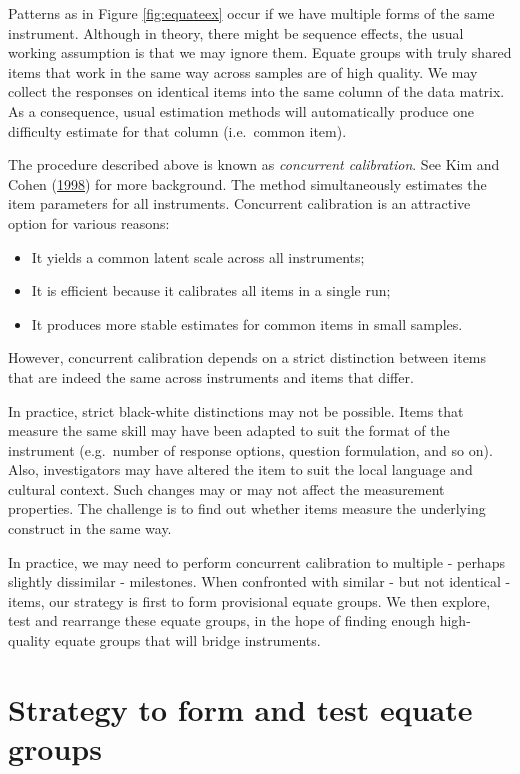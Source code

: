 \documentclass[
]{book}
\providecommand{\tightlist}{%
  \setlength{\itemsep}{0pt}\setlength{\parskip}{0pt}}
\begin{document}
Patterns as in Figure \ref{fig:equateex} occur if we have multiple forms of the same instrument. Although in theory, there might be sequence effects, the usual working assumption is that we may ignore them. Equate groups with truly shared items that work in the same way across samples are of high quality. We may collect the responses on identical items into the same column of the data matrix. As a consequence, usual estimation methods will automatically produce one difficulty estimate for that column (i.e.~common item).

The procedure described above is known as \emph{concurrent calibration}. See Kim and Cohen (\protect\hyperlink{ref-kim1998}{1998}) for more background. The method simultaneously estimates the item parameters for all instruments. Concurrent calibration is an attractive option for various reasons:

\begin{itemize}
\tightlist
\item
  It yields a common latent scale across all instruments;
\item
  It is efficient because it calibrates all items in a single run;
\item
  It produces more stable estimates for common items in small samples.
\end{itemize}

However, concurrent calibration depends on a strict distinction between items that are indeed the same across instruments and items that differ.

In practice, strict black-white distinctions may not be possible. Items that measure the same skill may have been adapted to suit the format of the instrument (e.g.~number of response options, question formulation, and so on). Also, investigators may have altered the item to suit the local language and cultural context. Such changes may or may not affect the measurement properties. The challenge is to find out whether items measure the underlying construct in the same way.

In practice, we may need to perform concurrent calibration to multiple - perhaps slightly dissimilar - milestones. When confronted with similar - but not identical - items, our strategy is first to form provisional equate groups. We then explore, test and rearrange these equate groups, in the hope of finding enough high-quality equate groups that will bridge instruments.

\hypertarget{sec:equaterules}{%
\section{Strategy to form and test equate groups}\label{sec:equaterules}}
\end{document}
